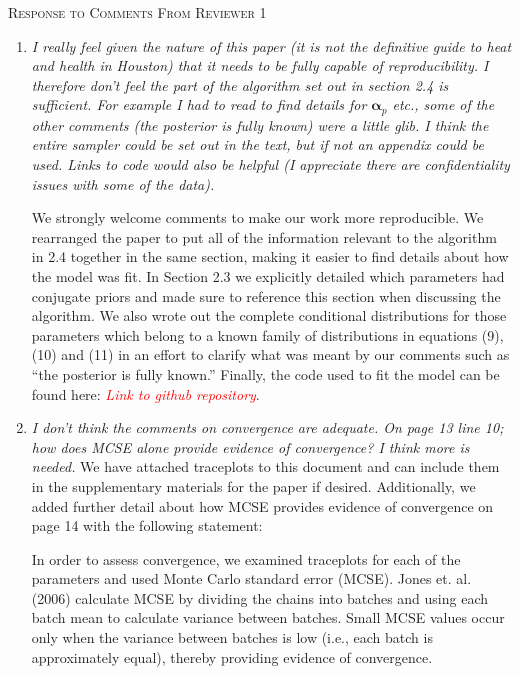 \documentclass{article}
\begin{document}
\begin{center}{\large \textsc{Response to Comments From Reviewer 1}}\end{center}
\begin{enumerate}
  \item \textit{I really feel given the nature of this paper (it is not the definitive guide to heat and health in Houston) that it needs to be fully capable of reproducibility.   I therefore don't feel the part of the algorithm set out in section 2.4 is sufficient.   For example I had to read to find details for $\boldsymbol{\alpha}_p$ etc., some of the other comments (the posterior is fully known) were a little glib.   I think the entire sampler could be set out in the text, but if not an appendix could be used. Links to code would also be helpful (I appreciate there are confidentiality issues with some of the data).}

We strongly welcome comments to make our work more reproducible. We rearranged the paper to put all of the information relevant to the algorithm in 2.4 together in the same section, making it easier to find details about how the model was fit. In Section 2.3 we explicitly detailed which parameters had conjugate priors and made sure to reference this section when discussing the algorithm. We also wrote out the complete conditional distributions for those parameters which belong to a known family of distributions in equations (9), (10) and (11) in an effort to clarify what was meant by our comments such as ``the posterior is fully known.'' Finally, the code used to fit the model can be found here: \textcolor{red}{\textit{Link to github repository}}.


\item\textit{I don't think the comments on convergence are adequate.   On page 13 line 10; how does MCSE alone provide evidence of convergence? I think more is needed.}
We have attached traceplots to this document and can include them in the supplementary materials for the paper if desired. Additionally, we added further detail about how MCSE provides evidence of convergence on page 14 with the following statement:

\begin{displayquote}
In order to assess convergence, we examined traceplots for each of the parameters and used Monte Carlo standard error (MCSE). Jones et. al. (2006) calculate MCSE by dividing the chains into batches and using each batch mean to calculate variance between batches. Small MCSE values occur only when the variance between batches is low (i.e., each batch is approximately equal), thereby providing evidence of convergence.
\end{displayquote}


\end{enumerate}
\end{document}
